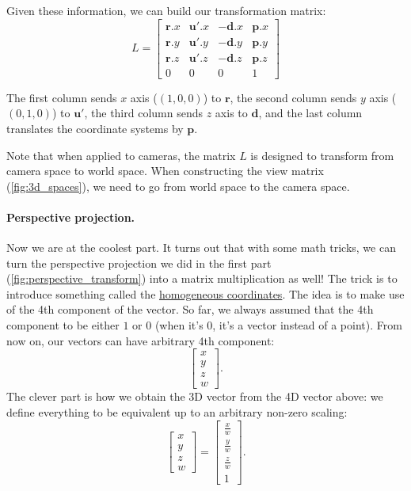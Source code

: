 Given these information, we can build our transformation matrix:
\begin{equation}
L = 
\begin{bmatrix}
\mathbf{r}.x & \mathbf{u}'.x & -\mathbf{d}.x & \mathbf{p}.x \\
\mathbf{r}.y & \mathbf{u}'.y & -\mathbf{d}.y & \mathbf{p}.y \\
\mathbf{r}.z & \mathbf{u}'.z & -\mathbf{d}.z & \mathbf{p}.z \\
0 & 0 & 0 & 1 
\end{bmatrix}
\end{equation}

The first column sends $x$ axis ($(1, 0, 0)$) to $\mathbf{r}$, the second column sends $y$ axis ($(0, 1, 0)$) to $\mathbf{u}'$, the third column sends $z$ axis to $\mathbf{d}$, and the last column translates the coordinate systems by $\mathbf{p}$.

Note that when applied to cameras, the matrix $L$ is designed to transform from camera space to world space. When constructing the view matrix (\cref{fig:3d_spaces}), we need to go from world space to the camera space. 

\paragraph{Perspective projection.}
Now we are at the coolest part. It turns out that with some math tricks, we can turn the perspective projection we did in the first part (\cref{fig:perspective_transform}) into a matrix multiplication as well! The trick is to introduce something called the \href{https://en.wikipedia.org/wiki/Homogeneous_coordinates}{homogeneous coordinates}. The idea is to make use of the 4th component of the vector. So far, we always assumed that the 4th component to be either $1$ or $0$ (when it's $0$, it's a vector instead of a point). From now on, our vectors can have arbitrary 4th component:
\begin{equation}
\begin{bmatrix}
x \\
y \\
z \\
w
\end{bmatrix}.
\end{equation}
The clever part is how we obtain the 3D vector from the 4D vector above: we define everything to be equivalent up to an arbitrary non-zero scaling:
\begin{equation}
\begin{bmatrix}
x \\
y \\
z \\
w
\end{bmatrix} =
\begin{bmatrix}
\frac{x}{w} \\
\frac{y}{w} \\
\frac{z}{w} \\
1
\end{bmatrix}.
\end{equation}

